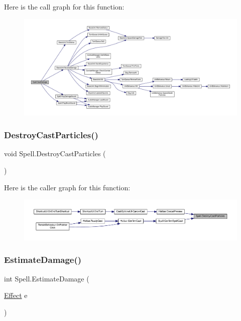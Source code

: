 Here is the call graph for this function\+:
\nopagebreak
\begin{figure}[H]
\begin{center}
\leavevmode
\includegraphics[width=350pt]{class_spell_ad2e4f64f1f7ced4b69c55619d5fdb0b0_cgraph}
\end{center}
\end{figure}
\mbox{\label{class_spell_a46dfa81169863ddb791b3c7d5121fcb8}} 
\subsubsection{\texorpdfstring{DestroyCastParticles()}{DestroyCastParticles()}}
{\footnotesize\ttfamily void Spell.\+Destroy\+Cast\+Particles (\begin{DoxyParamCaption}{ }\end{DoxyParamCaption})}

Here is the caller graph for this function\+:
\nopagebreak
\begin{figure}[H]
\begin{center}
\leavevmode
\includegraphics[width=350pt]{class_spell_a46dfa81169863ddb791b3c7d5121fcb8_icgraph}
\end{center}
\end{figure}
\mbox{\label{class_spell_aa5a9b6a6b13fcd1cfed9eb43e123ca23}} 
\subsubsection{\texorpdfstring{EstimateDamage()}{EstimateDamage()}}
{\footnotesize\ttfamily int Spell.\+Estimate\+Damage (\begin{DoxyParamCaption}\item[{\mbox{\hyperlink{class_effect}{Effect}}}]{e }\end{DoxyParamCaption})}

